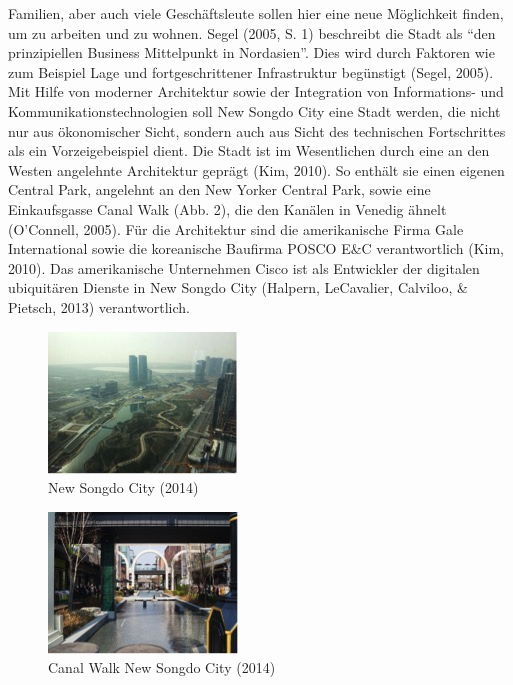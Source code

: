 \documentclass[a4paper,
fontsize=11pt,
oneside,
numbers=noperiodatend,
parskip=half-,
bibliography=totoc,
final
]{scrartcl}
\begin{document}
Familien, aber auch viele Geschäftsleute sollen hier eine neue
Möglichkeit finden, um zu arbeiten und zu wohnen. Segel (2005, S. 1)
beschreibt die Stadt als \enquote{den prinzipiellen Business Mittelpunkt
in Nordasien}. Dies wird durch Faktoren wie zum Beispiel Lage und
fortgeschrittener Infrastruktur begünstigt (Segel, 2005). Mit Hilfe von
moderner Architektur sowie der Integration von Informations- und
Kommunikationstechnologien soll New Songdo City eine Stadt werden, die
nicht nur aus ökonomischer Sicht, sondern auch aus Sicht des technischen
Fortschrittes als ein Vorzeigebeispiel dient. Die Stadt ist im
Wesentlichen durch eine an den Westen angelehnte Architektur geprägt
(Kim, 2010). So enthält sie einen eigenen Central Park, angelehnt an den
New Yorker Central Park, sowie eine Einkaufsgasse Canal Walk (Abb. 2),
die den Kanälen in Venedig ähnelt (O'Connell, 2005). Für die Architektur
sind die amerikanische Firma Gale International sowie die koreanische
Baufirma POSCO E\&C verantwortlich (Kim, 2010). Das amerikanische
Unternehmen Cisco ist als Entwickler der digitalen ubiquitären Dienste
in New Songdo City (Halpern, LeCavalier, Calviloo, \& Pietsch, 2013)
verantwortlich.

\begin{figure}[htbp]
\centering
\includegraphics{img/Abbildung1.jpg}
\caption{New Songdo City (2014)}
\end{figure}

\begin{figure}[htbp]
\centering
\includegraphics{img/Abbildung2.jpg}
\caption{Canal Walk New Songdo City (2014)}
\end{figure}
\end{document}
